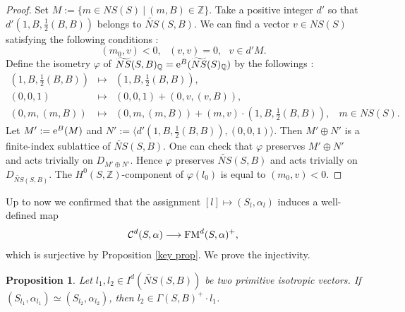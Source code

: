 \documentclass{article}
\theoremstyle{plain}
\newtheorem{proposition}[theorem]{Proposition}%
\theoremstyle{definition}
\theoremstyle{remark}
\newcommand{\Z}{{\mathbb Z}}
\newcommand{\Q}{{\mathbb Q}}
\begin{document}
\begin{proof}
Set 
$M := \{ m \in NS(S) \: | \: (m, B) \in {\Z} \}$. 
Take a positive integer  
$d'$ so that 
$d'(1, B, \frac{1}{2}(B, B))$ 
belongs to 
$\widetilde{NS}(S, B)$. 
We can find a vector 
$v\in NS(S)$ 
satisfying the following conditions : 
\begin{equation*}
(m_{0}, v) < 0, \: \: \: (v, v)=0, \: \: \: v \in d'M. 
\end{equation*}
Define the isometry $\varphi $ 
of $\widetilde{NS}(S, B)_{{\Q}} = {\rm e\/}^{B}(\widetilde{NS}(S)_{{\Q}})$ 
by the followings :  
\begin{eqnarray*}
(1, B, \frac{1}{2}(B, B)) & \mapsto &  (1, B, \frac{1}{2}(B, B)),  \\
(0, 0, 1)                 & \mapsto &  (0, 0, 1) + (0, v, (v, B)),  \\ 
(0, m, (m, B))            & \mapsto &  (0, m, (m, B)) + (m, v)\cdot (1, B, \frac{1}{2}(B, B)), \: \: \: \: 
m \in NS(S).
\end{eqnarray*}
Let 
$M':= {\rm e\/}^{B}(M)$ 
and 
$N' := \langle d'(1, B, \frac{1}{2}(B, B)), (0, 0, 1) \rangle $. 
Then 
$M'\oplus N'$ 
is a finite-index sublattice of 
$\widetilde{NS}(S, B)$. 
One can check that 
$\varphi $ preserves 
$M' \oplus N'$ and acts trivially on $D_{M'\oplus N'}$. 
Hence 
$\varphi $ preserves 
$\widetilde{NS}(S, B)$ and acts trivially on $D_{\widetilde{NS}(S, B)}$. 
The $H^{0}(S, {\Z})$-component of 
$\varphi (l_{0})$ is equal to $(m_{0}, v)<0$. 
\end{proof} 




Up to now we confirmed that 
the assignment 
$[l] \mapsto (S_{l}, \alpha _{l})$ 
induces a well-defined map 
\begin{equation*}\label{surjection}
\mathcal{C}^{d}(S, \alpha ) 
\longrightarrow 
{\rm FM\/}^{d}(S, \alpha )^{+},  
\end{equation*} 
which is surjective by Proposition \ref{key prop}.  
We prove the injectivity.   



\begin{proposition}
Let 
$l_{1}, l_{2} \in I^{d}(\widetilde{NS}(S, B))$ 
be two primitive isotropic vectors. 
If 
$(S_{l_{1}}, \alpha _{l_{1}}) \simeq (S_{l_{2}}, \alpha _{l_{2}})$, 
then  
$l_{2} \in \Gamma (S, B)^{+}\cdot l_{1}$. 
\end{proposition}
\end{document}

